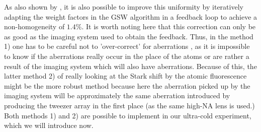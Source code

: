 As also shown by \cite{Nogrette2014}, it is also possible to improve this uniformity by iteratively adapting the weight factors in the \ac{GSW} algorithm in a feedback loop to achieve a non-homogeneity of $1.4\%$.
It is worth noting here that this correction can only be as good as the imaging system used to obtain the feedback. 
Thus, in the method 1) one has to be careful not to 'over-correct' for aberrations \cite{Labuhn2016}, as it is impossible to know if the aberrations really occur in the place of the atoms or are rather a result of the imaging system which will also have aberrations. 
Because of this, the latter method 2) of really looking at the Stark shift by the atomic fluorescence might be the more robust method because here the aberration picked up by the imaging system will be approximately the same aberration introduced by producing the tweezer array in the first place (as the same high-NA lens is used.)
Both methods 1) and 2) are possible to implement in our ultra-cold experiment, which we will introduce now.







